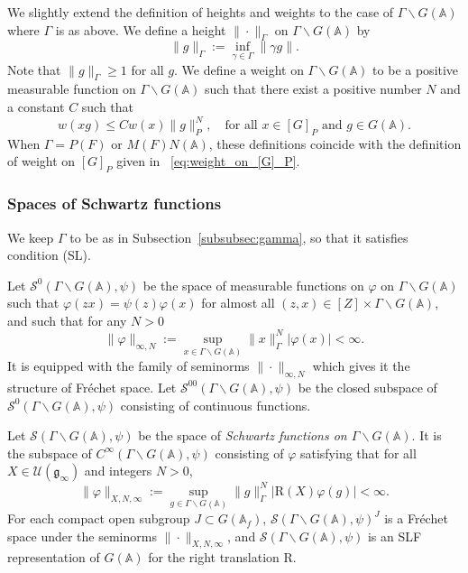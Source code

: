 \documentclass[letterpaper,11pt]{amsart}
\newcommand{\fg}{\mathfrak{g}}
\newcommand{\bA}{\mathbb{A}}
\newcommand{\cS}{\mathcal{S}}
\newcommand{\cU}{\mathcal{U}}
\newcommand{\bs}{\backslash}
\newcommand{\<}{\negthickspace}
\providecommand{\abs}[1]{\lvert#1\rvert}
\providecommand{\aabs}[1]{\lVert#1\rVert}
\theoremstyle{definition}
\theoremstyle{plain}
\theoremstyle{remark}
\numberwithin{equation}{section}
\begin{document}
We slightly extend the definition of heights and weights to the case of $\Gamma \bs G(\bA)$ where $\Gamma$ is as above. We define a height $\| \cdot \|_{\Gamma}$ on $\Gamma
\backslash G(\bA)$ by
    \[
        \| g \|_\Gamma := \inf_{\gamma \in \Gamma} \| \gamma g \|.
    \]
Note that $\| g \|_\Gamma \ge 1$ for all $g$. We define a weight on $\Gamma \backslash G(\bA)$ to be a positive measurable function on $\Gamma \backslash G(\bA)$
such that there exist a positive number $N$ and a constant $C$ such that
    \[
    w(xg) \leq C w(x) \aabs{g}_P^N, \quad
    \text{for all $x \in [G]_P$ and $g\in G(\bA)$}.
    \]
When $\Gamma = P(F)$ or $M(F)N(\bA)$, these definitions coincide with the definition of weight on $[G]_P$ given in ~\eqref{eq:weight_on_[G]_P}.



\subsubsection{Spaces of Schwartz functions}

We keep $\Gamma$ to be as in Subsection~\ref{subsubsec:gamma}, so that it satisfies condition (SL).



Let $\cS^0(\Gamma \backslash G(\bA),\psi)$ be the space of measurable
functions on $\varphi$ on $\Gamma \backslash G(\bA)$ such that
$\varphi(zx)=\psi(z) \varphi(x)$ for almost all $(z,x) \in [Z] \times \Gamma
\backslash G(\bA)$, and such that for any $N>0$
    \[
    \| \varphi \|_{\infty,N} :=
    \sup_{x \in \Gamma \backslash G(\bA)} \|x\|_{\Gamma}^N |\varphi(x)|
    < \infty.
    \]
It is equipped with the family of seminorms $\| \cdot \|_{\infty,N}$
which gives it the structure of Fr\'{e}chet space. Let $\cS^{00}(\Gamma
\backslash G(\bA),\psi)$ be the closed subspace of $\cS^0(\Gamma \backslash
G(\bA),\psi)$ consisting of continuous functions.

Let $\cS(\Gamma \backslash G(\bA),\psi)$ be the space of \emph{Schwartz
functions on $\Gamma \backslash G(\bA)$}. It is the subspace of
$C^\infty(\Gamma \backslash G(\bA),\psi)$ consisting of $\varphi$ satisfying
that for all $X \in \cU(\fg_\infty)$
and integers $N>0$,
    \[
    \aabs{\varphi}_{X,N,\infty} :=
    \sup_{g \in \Gamma \backslash G(\bA)} \aabs{g}_{\Gamma}^N
    \abs{\mathrm{R}(X)\varphi(g)}
    < \infty.
    \]
For each compact open subgroup $J \subset G(\bA_{f})$, $\cS(\Gamma
\backslash G(\bA),\psi)^J$ is a Fr\'{e}chet space under the seminorms $\| \cdot
\|_{X,N,\infty}$, and $\cS(\Gamma \backslash G(\bA),\psi)$ is an SLF representation of $G(\bA)$ for the right translation $\mathrm{R}$.
\end{document}
